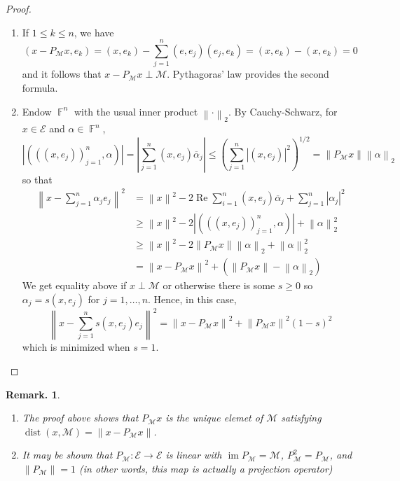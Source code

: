 \documentclass[11pt, a4paper]{memoir}
\DeclareMathOperator{\F}{{\mathbb{F}}}
\newcommand{\norm}[1]{\ensuremath{\left\lVert#1\right\rVert}}
\theoremstyle{change}
\theoremstyle{plain}
\theoremstyle{nonumberplain}
\newtheorem{remark}{Remark.}
\newtheorem{proof}{Proof}
\DeclareMathOperator{\im}{im}
\renewcommand{\Re}{\ensuremath{\operatorname{Re}}}
\DeclareMathOperator{\dist}{dist}
\newcommand{\inr}[1]{\ensuremath{\left(#1\right)}}
\numberwithin{equation}{section}
\begin{document}
\begin{proof}
    \begin{enumerate}[nl,r]
        \item If $1\leq k\leq n$, we have
            \begin{equation*}
                \inr{x-P_{\mathcal{M}}x,e_k} = \inr{x,e_k}-\sum_{j=1}^n\inr{e,e_j}\inr{e_j,e_k}=\inr{x,e_k}-\inr{x,e_k}=0
            \end{equation*}
            and it follows that $x-P_{\mathcal{M}}x\perp\mathcal{M}$.
            Pythagoras' law provides the second formula.
        \item Endow $\F^n$ with the usual inner product $\norm{\cdot}_2$.
            By Cauchy-Schwarz, for $x\in\mathcal{E}$ and $\alpha\in\F^n$,
            \begin{equation*}
                \left\lvert\inr{((x,e_j))_{j=1}^n,\alpha}\right\rvert=\left\lvert\sum_{j=1}^n(x,e_j)\overline{\alpha}_j\right\rvert\leq\left(\sum_{j=1}^n|\inr{x,e_j}|^2\right)^{1/2}=\norm{P_{\mathcal{M}}x}\norm{\alpha}_2
            \end{equation*}
            so that
            \begin{align*}
                \norm{x-\sum_{j=1}^n\alpha_je_j}^2 &= \norm{x}^2-2\Re\sum_{i=1}^n\inr{x,e_j}\overline{\alpha}_j+\sum_{j=1}^n|\alpha_j|^2\\
                                                   &\geq\norm{x}^2-2\left\lvert\left((\inr{x,e_j})_{j=1}^n,\alpha\right)\right\rvert+\norm{\alpha}_2^2\\
                                                   &\geq\norm{x}^2-2\norm{P_{\mathcal{M}}x}\norm{\alpha}_2+\norm{\alpha}_2^2\\
                                                   &=\norm{x-P_{\mathcal{M}}x}^2+\left(\norm{P_{\mathcal{M}}x}-\norm{\alpha}_2\right)
            \end{align*}
            We get equality above if $x\perp\mathcal{M}$ or otherwise there is some $s\geq0$ so $\alpha_j=s\inr{x,e_j}$ for $j=1,\ldots,n$.
            Hence, in this case,
            \begin{equation*}
                \norm{x-\sum_{j=1}^n s\inr{x,e_j}e_j}^2=\norm{x-P_{\mathcal{M}}x}^2+\norm{P_{\mathcal{M}}x}^2(1-s)^2
            \end{equation*}
            which is minimized when $s=1$.
    \end{enumerate}
\end{proof}
\begin{remark}
    \begin{enumerate}[nl,r]
        \item The proof above shows that $P_{\mathcal{M}}x$ is the unique elemet of $\mathcal{M}$ satisfying $\dist(x,\mathcal{M})=\norm{x-P_{\mathcal{M}}x}$.
        \item It may be shown that $P_{\mathcal{M}}:\mathcal{E}\to\mathcal{E}$ is linear with $\im P_{\mathcal{M}}=\mathcal{M}$, $P_{\mathcal{M}}^2=P_{\mathcal{M}}$, and $\norm{P_{\mathcal{M}}}=1$ (in other words, this map is actually a projection operator)
    \end{enumerate}
\end{remark}
\end{document}

